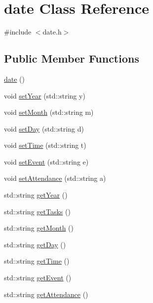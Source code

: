 \hypertarget{classdate}{}\section{date Class Reference}
\label{classdate}


{\ttfamily \#include $<$date.\+h$>$}

\subsection*{Public Member Functions}
\begin{DoxyCompactItemize}
\item 
\hyperlink{classdate_ace1e9bd1562330f4d03a385ee0cc2eba}{date} ()
\item 
void \hyperlink{classdate_a768f9154bd836be32a85f6b75867698a}{set\+Year} (std\+::string y)
\item 
void \hyperlink{classdate_a8670c70e6b4164ec3be0b14f53ff0205}{set\+Month} (std\+::string m)
\item 
void \hyperlink{classdate_a28a572ab0502125e23a351dad18aa9af}{set\+Day} (std\+::string d)
\item 
void \hyperlink{classdate_a6775df9799798629ef0c899030885235}{set\+Time} (std\+::string t)
\item 
void \hyperlink{classdate_aa0fe205a0a19cc07929a466ae3be467a}{set\+Event} (std\+::string e)
\item 
void \hyperlink{classdate_a2e519c8725e5421dab0378363f9a2ae1}{set\+Attendance} (std\+::string a)
\item 
std\+::string \hyperlink{classdate_af1fb1701086c8aac3b480ff52f48065b}{get\+Year} ()
\item 
std\+::string \hyperlink{classdate_a82d3639e939f437039f01ff702dca8a6}{get\+Tasks} ()
\item 
std\+::string \hyperlink{classdate_a0e08ae406a3f50eb28f854f90beb3a72}{get\+Month} ()
\item 
std\+::string \hyperlink{classdate_acb73db9ebcfe02f4a9ee9caa57ccf725}{get\+Day} ()
\item 
std\+::string \hyperlink{classdate_abc00445f7dad83e1b6bc7c7a27736ef5}{get\+Time} ()
\item 
std\+::string \hyperlink{classdate_ad1ba2d91051725eae822b1dc21f45ff5}{get\+Event} ()
\item 
std\+::string \hyperlink{classdate_adf8c535b09b2adadcfb27e49de6b588e}{get\+Attendance} ()
\end{DoxyCompactItemize}
